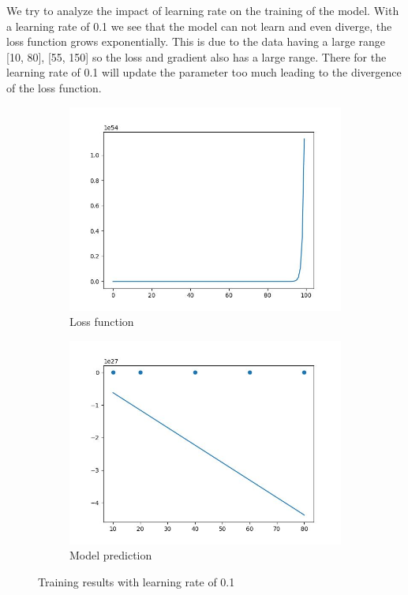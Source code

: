 \documentclass{article}
\begin{document}
We try to analyze the impact of learning rate on the training of the model. 
With a learning rate of 0.1 we see that the model can not learn and even diverge, the loss function grows exponentially. This is due to the data having a large range [10, 80], [55, 150] so the loss and gradient also has a large range. There for the learning rate of 0.1 will update the parameter too much leading to the divergence of the loss function.

\begin{figure}[H]
    \begin{subfigure}{0.5\linewidth}
        \centering
        \includegraphics[width=\linewidth]{loss_train_no_norm_0.1lr.jpg}
        \caption{Loss function}
    \end{subfigure}
    \begin{subfigure}{0.5\linewidth}
        \centering
        \includegraphics[width=\linewidth]{output_train_no_norm_0.1lr.jpg}
        \caption{Model prediction}
    \end{subfigure}
    \caption{Training results with learning rate of 0.1}
    \label{fig:enter-label}
\end{figure}
\end{document}
